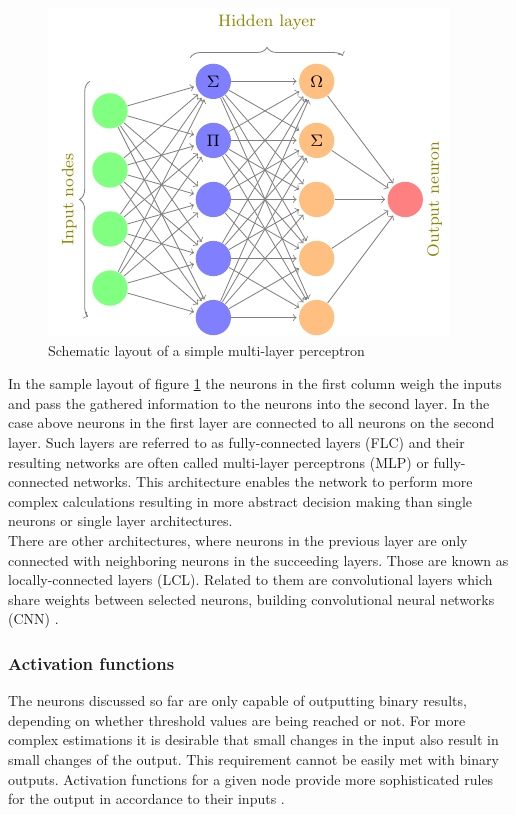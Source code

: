 \begin{figure}[H]
\centering
\includegraphics[height=.25\textheight, width=.5\textwidth]{Figures/neuralnet}
\decoRule
\caption[Schematic layout of a simple multi-layer perceptron]{Schematic layout of a simple multi-layer perceptron}
\label{fig:nn}
\end{figure}


In the sample layout of figure \ref{fig:nn} the neurons in the first column weigh the
inputs and pass the gathered information to the neurons into the second layer. In the case
above neurons in the first layer are connected to all neurons on the second layer. Such
layers are referred to as fully-connected layers (FLC) and their resulting networks are
often called multi-layer perceptrons (MLP) or fully-connected networks. This architecture
enables the network to perform more complex calculations resulting in more abstract
decision making than single neurons or single layer architectures.\\
There are other architectures, where neurons in the previous layer are only connected with
neighboring neurons in the succeeding layers. Those are known as locally-connected layers
(LCL). Related to them are convolutional layers which share weights between selected
neurons, building convolutional neural networks (CNN) \cite{lecun1999object}.

\subsubsection{Activation functions}

The neurons discussed so far are only capable of outputting binary results, depending on
whether threshold values are being reached or not. For more complex estimations it is
desirable that small changes in the input also result in small changes of the output. This
requirement cannot be easily met with binary outputs. Activation functions for a given
node provide more sophisticated rules for the output in accordance to their inputs
\cite{vzilinskas2006practical}.

